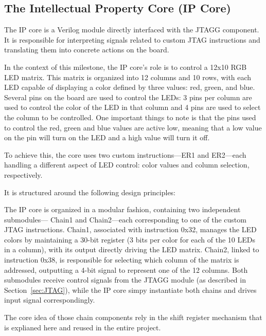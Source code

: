 \documentclass[a4paper,11pt,oneside]{report}
\begin{document}
\subsection{The Intellectual Property Core (IP Core)}

The IP core is a Verilog module directly interfaced with the JTAGG component. 
It is responsible for interpreting signals related to custom JTAG instructions and translating them into concrete actions on the board.

In the context of this milestone, the IP core’s role is to control a 12x10 RGB LED matrix.
This matrix is organized into 12 columns and 10 rows, with each LED capable of displaying a color defined by three values: red, green, and blue. Several pins on the board are
used to control the LEDs: 3 pins per column are used to control the color of the LED in that column and 4 pins are used to select the column to be controlled.  
One important things to note is that the pins used to control the red, green and blue values are active low, meaning that a low value on the pin will turn on the LED and a high value will turn it off.

To achieve this, the core uses two custom instructions—ER1 and ER2—each handling a different aspect of LED control: color values and column selection, respectively.

It is structured around the following design principles:

The IP core is organized in a modular fashion, containing two independent submodules—
Chain1 and Chain2—each corresponding to one of the custom JTAG instructions. Chain1,
associated with instruction 0x32, manages the LED colors by maintaining a 30-bit register
(3 bits per color for each of the 10 LEDs in a column), with its output directly driving the
LED matrix. Chain2, linked to instruction 0x38, is responsible for selecting which column
of the matrix is addressed, outputting a 4-bit signal to represent one of the 12 columns.
Both submodules receive control signals from the JTAGG module (as described in
Section~\ref{sec:JTAG}), while the IP core simpy instantiate both chains and drives input signal correspondingly.

The core idea of those chain components rely in the shift register mechanism that is explianed here and reused in the entire project.
\end{document}
